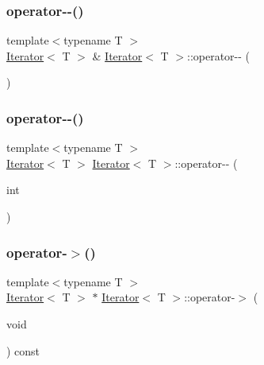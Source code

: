 \mbox{\label{classIterator_aa158fc4216d0b532f8776cb1e9f8ac26}} 
\subsubsection{\texorpdfstring{operator-\/-\/()}{operator--()}\hspace{0.1cm}{\footnotesize\ttfamily [1/2]}}
{\footnotesize\ttfamily template$<$typename T $>$ \\
\hyperlink{classIterator}{Iterator}$<$ T $>$ \& \hyperlink{classIterator}{Iterator}$<$ T $>$\+::operator-\/-\/ (\begin{DoxyParamCaption}{ }\end{DoxyParamCaption})}

\mbox{\label{classIterator_a8ee6f51e0928e7acb530a2f5a262a13e}} 
\subsubsection{\texorpdfstring{operator-\/-\/()}{operator--()}\hspace{0.1cm}{\footnotesize\ttfamily [2/2]}}
{\footnotesize\ttfamily template$<$typename T $>$ \\
\hyperlink{classIterator}{Iterator}$<$ T $>$ \hyperlink{classIterator}{Iterator}$<$ T $>$\+::operator-\/-\/ (\begin{DoxyParamCaption}\item[{int}]{ }\end{DoxyParamCaption})}

\mbox{\label{classIterator_adf83c8af24e2ef2a112963023a04b6a1}} 
\subsubsection{\texorpdfstring{operator-\/$>$()}{operator->()}}
{\footnotesize\ttfamily template$<$typename T $>$ \\
\hyperlink{classIterator}{Iterator}$<$ T $>$ $\ast$ \hyperlink{classIterator}{Iterator}$<$ T $>$\+::operator-\/$>$ (\begin{DoxyParamCaption}\item[{void}]{ }\end{DoxyParamCaption}) const}


